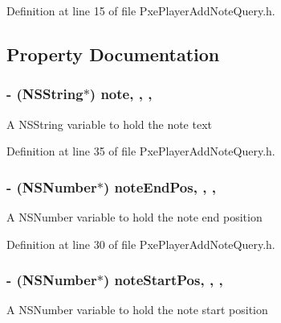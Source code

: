 Definition at line 15 of file Pxe\-Player\-Add\-Note\-Query.\-h.



\subsection{Property Documentation}
\hypertarget{interface_pxe_player_add_note_query_acbba394938104676d54315480c713611}{
\subsubsection[{note}]{\setlength{\rightskip}{0pt plus 5cm}-\/ (N\-S\-String$\ast$) note\hspace{0.3cm}{\ttfamily [read]}, {\ttfamily [write]}, {\ttfamily [nonatomic]}, {\ttfamily [strong]}}}\label{interface_pxe_player_add_note_query_acbba394938104676d54315480c713611}
A N\-S\-String variable to hold the note text 

Definition at line 35 of file Pxe\-Player\-Add\-Note\-Query.\-h.

\hypertarget{interface_pxe_player_add_note_query_adf1994bd1cad22ee5241e05f8ff1513d}{
\subsubsection[{note\-End\-Pos}]{\setlength{\rightskip}{0pt plus 5cm}-\/ (N\-S\-Number$\ast$) note\-End\-Pos\hspace{0.3cm}{\ttfamily [read]}, {\ttfamily [write]}, {\ttfamily [nonatomic]}, {\ttfamily [strong]}}}\label{interface_pxe_player_add_note_query_adf1994bd1cad22ee5241e05f8ff1513d}
A N\-S\-Number variable to hold the note end position 

Definition at line 30 of file Pxe\-Player\-Add\-Note\-Query.\-h.

\hypertarget{interface_pxe_player_add_note_query_a43eaa116777daa69de084d8b82c90022}{
\subsubsection[{note\-Start\-Pos}]{\setlength{\rightskip}{0pt plus 5cm}-\/ (N\-S\-Number$\ast$) note\-Start\-Pos\hspace{0.3cm}{\ttfamily [read]}, {\ttfamily [write]}, {\ttfamily [nonatomic]}, {\ttfamily [strong]}}}\label{interface_pxe_player_add_note_query_a43eaa116777daa69de084d8b82c90022}
A N\-S\-Number variable to hold the note start position 

